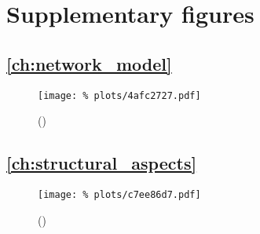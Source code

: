 





\section{Supplementary figures}\label{sec:supp_figures}

\subsection*{\autoref{ch:network_model}}

\begin{figure}[H]
  \centering
  \texttt{[image: \%
    plots/4afc2727.pdf]}
  \caption{()}
  \label{suppfig:rew_stats}
\end{figure}


\subsection*{\autoref{ch:structural_aspects}}

\begin{figure}[H]
  \centering
  \texttt{[image: \%
    plots/c7ee86d7.pdf]}
  \caption{()}
  \label{suppfig:out_degree}
\end{figure}





